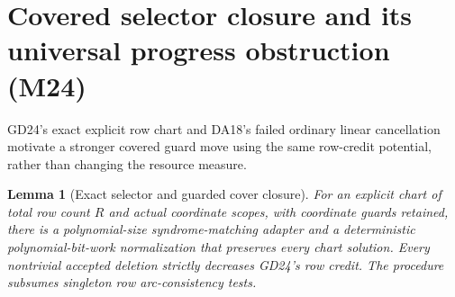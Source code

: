 \documentclass[11pt]{article}
\newtheorem{lemma}[theorem]{Lemma}
\begin{document}
\section{Covered selector closure and its universal progress obstruction (M24)}\label{sec:m24}
GD24's exact explicit row chart and DA18's failed ordinary linear cancellation motivate a stronger covered guard move using the same row-credit potential, rather than changing the resource measure.
\begin{lemma}[Exact selector and guarded cover closure]\label{lem:m24-cover}
For an explicit chart of total row count $R$ and actual coordinate scopes, with coordinate guards retained, there is a polynomial-size syndrome-matching adapter and a deterministic polynomial-bit-work normalization that preserves every chart solution. Every nontrivial accepted deletion strictly decreases GD24's row credit. The procedure subsumes singleton row arc-consistency tests.
\end{lemma}
\end{document}
